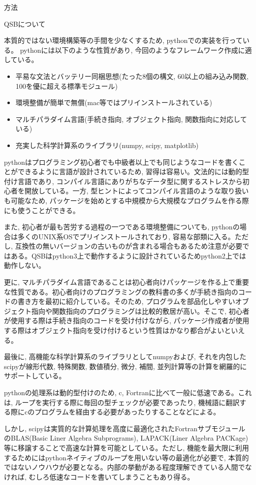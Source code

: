 \documentclass[a4paper, lualatex]{bxjsarticle}
\begin{document}
\begin{section}{方法}
\begin{subsection}{QSBについて}
    \par 本質的ではない環境構築等の手間を少なくするため, python\cite{python}での実装を行っている。
    pythonには以下のような性質があり, 今回のようなフレームワーク作成に適している。
    \begin{itemize}
        \item 平易な文法とバッテリー同梱思想(たった8個の構文, 60以上の組み込み関数, 100を優に超える標準モジュール)
        \item 環境整備が簡単で無償(mac等ではプリインストールされている)
        \item マルチパラダイム言語(手続き指向, オブジェクト指向, 関数指向に対応している)
        \item 充実した科学計算系のライブラリ(numpy, scipy, matplotlib)
    \end{itemize}
    \par pythonはプログラミング初心者でも中級者以上でも同じようなコードを書くことができるように言語が設計されているため, 習得は容易い。文法的には動的型付け言語であり, コンパイル言語にありがちなデータ型に関するストレスから初心者を開放している。一方, 型ヒントによってコンパイル言語のような取り扱いも可能なため, パッケージを始めとする中規模から大規模なプログラムを作る際にも使うことができる。
    \par また, 初心者が最も苦労する過程の一つである環境整備についても, pythonの場合は多くのUNIX系OSでプリインストールされており, 容易な部類に入る。ただし, 互換性の無いバージョンの古いものが含まれる場合もあるため注意が必要ではある。QSBはpython3上で動作するように設計されているためpython2上では動作しない。
    \par 更に, マルチパラダイム言語であることは初心者向けパッケージを作る上で重要な性質である。初心者向けのプログラミングの教科書の多くが手続き指向のコードの書き方を最初に紹介している。そのため, プログラムを部品化しやすいオブジェクト指向や関数指向のプログラミングは比較的敷居が高い。そこで, 初心者が使用する際は手続き指向のコードを受け付けながら, パッケージ作成者が使用する際はオブジェクト指向を受け付けるという性質はかなり都合がよいといえる。
    \par 最後に, 高機能な科学計算系のライブラリとしてnumpyおよび, それを内包したscipy\cite{scipy}が線形代数, 特殊関数, 数値積分, 微分, 補間, 並列計算等の計算を網羅的にサポートしている。
    \par pythonの処理系は動的型付けのため, c, Fortranに比べて一般に低速である。これは, ループを実行する際に毎回の型チェックが必要であったり, 機械語に翻訳する際にcのプログラムを経由する必要があったりすることなどによる。
    \par しかし, scipyは実質的な計算処理を高度に最適化されたFortranサブモジュールのBLAS(Basic Liner Algebra Subprograms), LAPACK(Liner Algebra PACKage)等に移譲することで高速な計算を可能としている。ただし, 機能を最大限に利用するためにはpythonネイティブのループを用いない等の最適化が必要で, 本質的ではないノウハウが必要となる。内部の挙動がある程度理解できている人間でなければ, むしろ低速なコードを書いてしまうこともあり得る。

\end{subsection}
\end{section}
\end{document}
